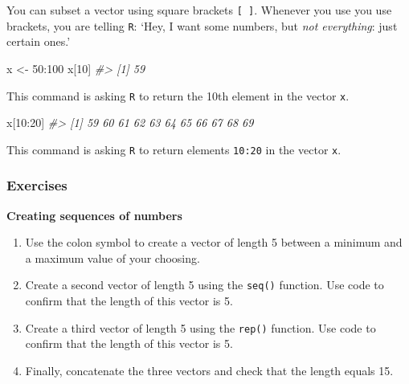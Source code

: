 \documentclass[
]{book}
\newenvironment{Shaded}{\begin{snugshade}}{\end{snugshade}}
\newcommand{\CommentTok}[1]{\textcolor[rgb]{0.56,0.35,0.01}{\textit{#1}}}
\newcommand{\DecValTok}[1]{\textcolor[rgb]{0.00,0.00,0.81}{#1}}
\newcommand{\NormalTok}[1]{#1}
\newcommand{\OtherTok}[1]{\textcolor[rgb]{0.56,0.35,0.01}{#1}}
\newcommand{\SpecialCharTok}[1]{\textcolor[rgb]{0.00,0.00,0.00}{#1}}
\begin{document}
You can subset a vector using square brackets \texttt{{[}\ {]}}. Whenever you use you use brackets, you are telling \texttt{R}: `Hey, I want some numbers, but \emph{not everything}: just certain ones.'

\begin{Shaded}
\begin{Highlighting}[]
\NormalTok{x }\OtherTok{\textless{}{-}} \DecValTok{50}\SpecialCharTok{:}\DecValTok{100}
\NormalTok{x[}\DecValTok{10}\NormalTok{]}
\CommentTok{\#\textgreater{} [1] 59}
\end{Highlighting}
\end{Shaded}

This command is asking \texttt{R} to return the 10th element in the vector \texttt{x}.

\begin{Shaded}
\begin{Highlighting}[]
\NormalTok{x[}\DecValTok{10}\SpecialCharTok{:}\DecValTok{20}\NormalTok{]}
\CommentTok{\#\textgreater{}  [1] 59 60 61 62 63 64 65 66 67 68 69}
\end{Highlighting}
\end{Shaded}

This command is asking \texttt{R} to return elements \texttt{10:20} in the vector \texttt{x}.

\hypertarget{exercises-3}{%
\subsubsection*{Exercises}\label{exercises-3}}

\textbf{Creating sequences of numbers}

\begin{enumerate}
\def\labelenumi{\arabic{enumi}.}
\item
  Use the colon symbol to create a vector of length 5 between a minimum and a maximum value of your choosing.
\item
  Create a second vector of length 5 using the \texttt{seq()} function. Use code to confirm that the length of this vector is 5.
\item
  Create a third vector of length 5 using the \texttt{rep()} function. Use code to confirm that the length of this vector is 5.
\item
  Finally, concatenate the three vectors and check that the length equals 15.
\end{enumerate}

~
\end{document}
